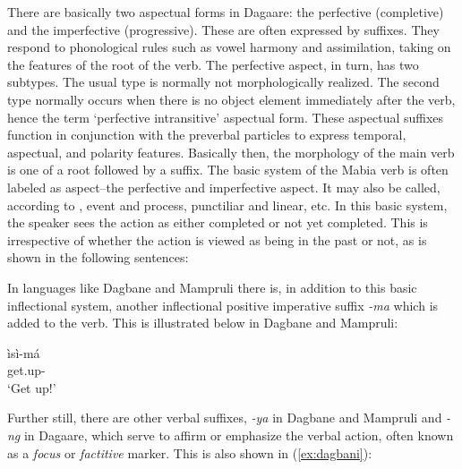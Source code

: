There are basically two aspectual forms in Dagaare: the perfective (completive) and the
imperfective (progressive). These are often expressed by suffixes. They respond to
phonological rules such as vowel harmony and assimilation, taking on the features of the root
of the verb. The perfective aspect, in turn, has two subtypes. The usual type is normally not
morphologically realized. The second type normally occurs when there is no object element
immediately after the verb, hence the term ‘perfective intransitive’ aspectual form. These
aspectual suffixes function in conjunction with the preverbal particles to express temporal,
aspectual, and polarity features. Basically then, the morphology of the main verb is one of a
root followed by a suffix.
The basic system of the Mabia verb is often labeled as aspect--the perfective and
imperfective aspect. It may also be called, according to \citet{Bendor-Samuel1971}, event and
process, punctiliar and linear, etc. In this basic system, the speaker sees the action as either
completed or not yet completed. This is irrespective of whether the action is viewed as being
in the past or not, as is shown in the following sentences:

\ea {}
\z\z 


In languages like Dagbane and Mampruli there is, in addition to this basic inflectional system, another inflectional positive imperative suffix \mbox{\textit{-ma}} which is added to the verb. This
is illustrated below in Dagbane and Mampruli:

\ea \gll ìsì-má\\
get.up-{\IMPV}\\
\glt ‘Get up!’ \z 


Further still, there are other verbal suffixes, \textit{-ya} in Dagbane and Mampruli and \textit{-ng} in
Dagaare, which serve to affirm or emphasize the verbal action, often known as a \textit{focus} or \textit{factitive} marker. This is also shown in (\ref{ex:dagbani}):

\ea\label{ex:dagbani} 
\z\z


